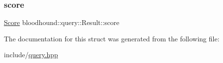 \mbox{\label{structbloodhound_1_1query_1_1Result_af9f240e486460b5130eff110b0f3c7a3}} 
\subsubsection{\texorpdfstring{score}{score}}
{\footnotesize\ttfamily \mbox{\hyperlink{structbloodhound_1_1Score}{Score}} bloodhound\+::query\+::\+Result\+::score}



The documentation for this struct was generated from the following file\+:\begin{DoxyCompactItemize}
\item 
include/\mbox{\hyperlink{query_8hpp}{query.\+hpp}}\end{DoxyCompactItemize}
